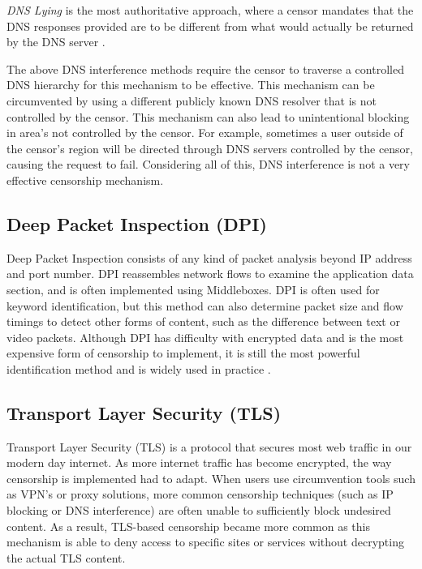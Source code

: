 \textit{DNS Lying} is the most authoritative approach, where a censor mandates that the DNS responses provided are to be different from what would actually be returned by the DNS server \cite{rfc9505}.

The above DNS interference methods require the censor to traverse a controlled DNS hierarchy for this mechanism to be effective. This mechanism can be circumvented by using a different publicly known DNS resolver that is not controlled by the censor. This mechanism can also lead to unintentional blocking in area's not controlled by the censor. For example, sometimes a user outside of the censor's region will be directed through DNS servers controlled by the censor, causing the request to fail. Considering all of this, DNS interference is not a very effective censorship mechanism.

\subsection{Deep Packet Inspection (DPI)}

Deep Packet Inspection consists of any kind of packet analysis beyond IP address and port number. DPI reassembles network flows to examine the application data section, and is often implemented using Middleboxes. DPI is often used for keyword identification, but this method can also determine packet size and flow timings to detect other forms of content, such as the difference between text or video packets. Although DPI has difficulty with encrypted data and is the most expensive form of censorship to implement, it is still the most powerful identification method and is widely used in practice \cite{rfc9505}.

\subsection{Transport Layer Security (TLS)}

Transport Layer Security (TLS) is a protocol that secures most web traffic in our modern day internet. As more internet traffic has become encrypted, the way censorship is implemented had to adapt. When users use circumvention tools such as VPN's or proxy solutions, more common censorship techniques (such as IP blocking or DNS interference) are often unable to sufficiently block undesired content. As a result, TLS-based censorship became more common as this mechanism is able to deny access to specific sites or services without decrypting the actual TLS content. 

